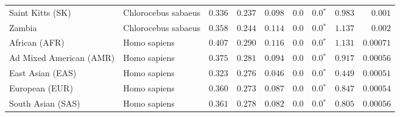 \begin{center}
\begin{adjustbox}{width = 1\textwidth}
\begin{tabular}{|l|l|r|r|r|r|r|r|r|}
            Saint Kitts (SK)                  & Chlorocebus sabaeus        & $ 0.336$ & $ 0.237$ & $ 0.098$ & $0.0$ & $\bm{0.0{^*}}$ & $ 0.983$ & $ 0.001$ \\
            Zambia        & Chlorocebus sabaeus        & $ 0.358$ & $ 0.244$ & $ 0.114$ & $0.0$ & $\bm{0.0{^*}}$ & $ 1.137$ & $ 0.002$ \\
            African (AFR)               & Homo sapiens        & $ 0.407$ & $ 0.290$ & $ 0.116$ & $0.0$ & $\bm{0.0{^*}}$ & $ 1.131$ & $0.00071$ \\
            Ad Mixed American (AMR)                 & Homo sapiens        & $ 0.375$ & $ 0.281$ & $ 0.094$ & $0.0$ & $\bm{0.0{^*}}$ & $ 0.917$ & $0.00056$ \\
            East Asian (EAS)              & Homo sapiens        & $ 0.323$ & $ 0.276$ & $ 0.046$ & $0.0$ & $\bm{0.0{^*}}$ & $ 0.449$ & $0.00051$ \\
            European (EUR)              & Homo sapiens        & $ 0.360$ & $ 0.273$ & $ 0.087$ & $0.0$ & $\bm{0.0{^*}}$ & $ 0.847$ & $0.00054$ \\
            South Asian (SAS)              & Homo sapiens        & $ 0.361$ & $ 0.278$ & $ 0.082$ & $0.0$ & $\bm{0.0{^*}}$ & $ 0.805$ & $0.00056$ \\
            \bottomrule
        \end{tabular}
    \end{adjustbox}
    \newpage
\end{center}

